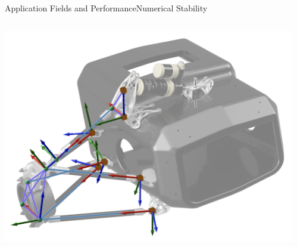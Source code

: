 \begin{frame}{Application Fields and Performance}{Numerical Stability}
  \vspace{-2.0em}\begin{columns}
    \centering
    \begin{column}[c]{0.3\textwidth}
      \includegraphics[width=\textwidth]{figures/fade_overview.png}
    \end{column}
    \begin{column}[c]{0.7\textwidth}
      \vspace{1em}\small{}
    \end{column}
  \end{columns}
\end{frame}

